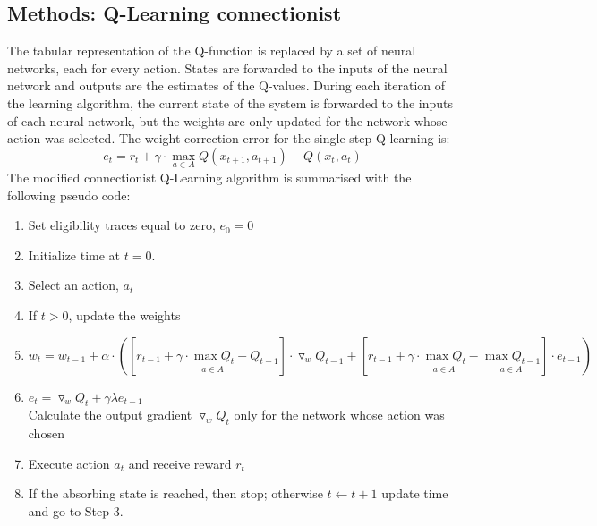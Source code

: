 \subsection{Methods: Q-Learning connectionist}
The tabular representation of the Q-function is replaced by a set of neural networks, each for every action.
States are forwarded to the inputs of the neural network and outputs are the estimates of the Q-values.
During each iteration of the learning algorithm, the current state of the system is forwarded to the inputs of
each neural network, but the weights are only updated for the network whose action was selected.
The weight correction error for the single step Q-learning is:
\begin{equation}
e_t=r_t+\gamma \cdot \max_{a \in A} Q(x_{t+1},a_{t+1})-Q(x_t,a_t)
\end{equation}
The modified connectionist Q-Learning algorithm is summarised with the following pseudo code:
\begin{enumerate}
 \item Set eligibility traces equal to zero, $e_0=0$
 \item Initialize time at $t=0$.
 \item Select an action, $a_t$
 \item If $t>0$, update the weights
 \item $w_t=w_{t-1} + \alpha \cdot ([r_{t-1}+\gamma \cdot \underset{a \in A}{\max Q_{t}} - Q_{t-1}]\cdot \triangledown_w Q_{t-1}
	    + [r_{t-1}+\gamma \cdot \underset{a \in A}{\max Q_{t}} - \underset{a \in A}{\max Q_{t-1}}]\cdot e_{t-1})$
 \item $e_t=\triangledown_w Q_{t} + \gamma \lambda e_{t-1}$ \\
       Calculate the output gradient $\triangledown_w Q_{t}$ only for the network whose action
	was chosen
 \item Execute action $a_t$ and receive reward $r_t$
 \item If the absorbing state is reached, then stop; otherwise $t \leftarrow t+1$ update time
and go to Step 3.
\end{enumerate}



